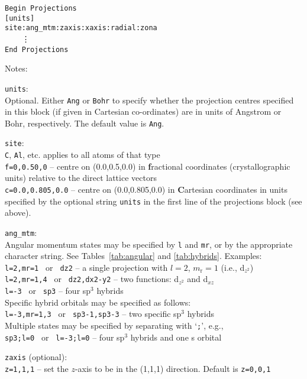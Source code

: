 \noindent
\verb#Begin Projections#\\
\verb#[units]#\\
\verb#site:ang_mtm:zaxis:xaxis:radial:zona#\\
\verb#    #\vdots\\
\verb#End Projections#

\noindent
Notes:

\noindent
\verb#units#:\\
Optional. Either \verb#Ang# or \verb#Bohr# to specify whether the
projection centres
specified in this block (if given in Cartesian co-ordinates) are in
units of Angstrom or Bohr, respectively. The default value is \verb#Ang#.

\noindent
\verb#site#:\\
\verb#C#, \verb#Al#, etc. applies to all atoms of that type\\
\verb#f=0,0.50,0# -- centre on (0.0,0.5,0.0) in \textbf{f}ractional coordinates
(crystallographic units) relative to the direct lattice vectors \\
\verb#c=0.0,0.805,0.0# -- centre on (0.0,0.805,0.0) in \textbf{C}artesian
coordinates in units specified by the optional string \verb#units# in
the first line of the projections block (see above).

\noindent
\verb#ang_mtm#:\\
 Angular momentum states may be specified by \verb#l# and \verb#mr#,
 or by the appropriate character string. See Tables~\ref{tab:angular}
 and \ref{tab:hybrids}. Examples:\\
 \verb#l=2,mr=1 # or \verb# dz2# -- a single projection with $l=2$,
 $m_{\textrm{r}}=1$ (i.e., d$_{z^{2}}$)\\
 \verb#l=2,mr=1,4 # or \verb# dz2,dx2-y2# -- two functions: d$_{z^{2}}$ and d$_{xz}$\\
 \verb#l=-3 # or \verb# sp3# -- four sp$^{3}$ hybrids\\
 Specific hybrid orbitals may be specified as follows:\\
 \verb#l=-3,mr=1,3 # or \verb# sp3-1,sp3-3# -- two specific sp$^{3}$ hybrids\\
 Multiple states may be specified by separating with
 `\verb#;#', e.g.,\\
 \verb#sp3;l=0 # or \verb# l=-3;l=0# -- four sp$^{3}$ hybrids and one s orbital

\noindent
\verb#zaxis# (optional):\\
\verb#z=1,1,1#  --  set the $z$-axis to be in the (1,1,1) direction. Default
is \verb#z=0,0,1#

